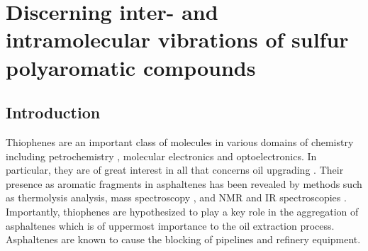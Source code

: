 \chapter[Discerning inter- and intramolecular vibrations]{Discerning inter- and intramolecular vibrations of sulfur polyaromatic compounds}
\minitoc
\restoregeometry

	\newpage
	
	\section{Introduction}
	
	Thiophenes are an important class of molecules in various domains of chemistry including petrochemistry \cite{waldo1991sulfur,mitra1998determination,lobodin2015separation},  molecular electronics \cite{katz2004recent,ong2008thiophene,vivas2011linear,silva2011controlling} and optoelectronics\cite{kim2010one}. In particular, they are of great interest in all that concerns oil upgrading \cite{kishita2003upgrading,samokhvalov2011heterogeneous,chen2015acylation}. Their presence as aromatic fragments in asphaltenes has been revealed by methods such as thermolysis analysis\cite{strausz1992molecular}, mass spectroscopy \cite{liu2010molecular,karimi2011quantitative},  and NMR and IR spectroscopies \cite{coelho2012elucidation,alhumaidan2016impact}. Importantly, thiophenes are hypothesized to play a key role in the aggregation of asphaltenes \cite{widany2001electronic,liu2014adjusting} which is of uppermost importance to the oil extraction process. Asphaltenes are known to cause the blocking of pipelines and refinery equipment.\\
	
